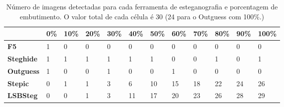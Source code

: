 \begin{table}[!ht]
  \begin{center}
    \begin{tabular}{|l|l|l|l|l|l|l|l|l|l|l|l|}
      \hline
& \textbf{0\%} & \textbf{10\%} & \textbf{20\%} & \textbf{30\%} & \textbf{40\%} & \textbf{50\%} & \textbf{60\%} & \textbf{70\%} & \textbf{80\%} & \textbf{90\%} & \textbf{100\%} \\ \hline
\textbf{F5} & 1 & 0 & 0 & 0 & 0 & 0 & 0 & 0 & 0 & 0 & 0 \\ \hline
\textbf{Steghide} & 1 & 1 & 1 & 1 & 1 & 1 & 0 & 0 & 1 & 0 & 1 \\ \hline
\textbf{Outguess} & 1 & 0 & 0 & 1 & 0 & 0 & 1 & 0 & 0 & 0 & 0%
\\ \hline
\textbf{Stepic} & 0 & 1 & 1 & 3 & 6 & 10 & 15 & 18 & 22 & 24 & 26 \\ \hline
\textbf{LSBSteg} & 0 & 0 & 1 & 3 & 11 & 17 & 20 & 23 & 26 & 28 & 29 \\ \hline
    \end{tabular}
  \end{center}
  \caption{Número de imagens detectadas para cada ferramenta de esteganografia e porcentagem de embutimento. O valor total de cada célula é 30 (24 para o Outguess com 100\%.)}
  \label{tab:embutimento-por-ferramenta}
\end{table}

